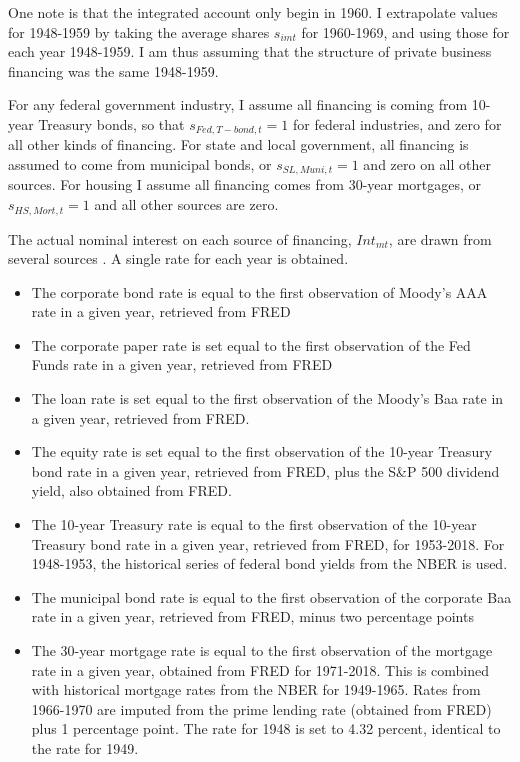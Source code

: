 \documentclass[11pt]{article}
\begin{document}
One note is that the integrated account only begin in 1960. I extrapolate values for 1948-1959 by taking the average shares $s_{imt}$ for 1960-1969, and using those for each year 1948-1959. I am thus assuming that the structure of private business financing was the same 1948-1959. 

For any federal government industry, I assume all financing is coming from 10-year Treasury bonds, so that $s_{Fed,T-bond,t} = 1$ for federal industries, and zero for all other kinds of financing. For state and local government, all financing is assumed to come from municipal bonds, or $s_{SL,Muni,t} = 1$ and zero on all other sources. For housing I assume all financing comes from 30-year mortgages, or $s_{HS,Mort,t}=1$ and all other sources are zero. 

The actual nominal interest on each source of financing, $Int_{mt}$, are drawn from several sources \citep{fedint,fredmort,moodys,nberhistory}. A single rate for each year is obtained.

\begin{itemize}
	\item The corporate bond rate is equal to the first observation of Moody's AAA rate in a given year, retrieved from FRED
	\item The corporate paper rate is set equal to the first observation of the Fed Funds rate in a given year, retrieved from FRED
	\item The loan rate is set equal to the first observation of the Moody's Baa rate in a given year, retrieved from FRED.
	\item The equity rate is set equal to the first observation of the 10-year Treasury bond rate in a given year, retrieved from FRED, plus the S\&P 500 dividend yield, also obtained from FRED.
	\item The 10-year Treasury rate is equal to the first observation of the 10-year Treasury bond rate in a given year, retrieved from FRED, for 1953-2018. For 1948-1953, the historical series of federal bond yields from the NBER is used. 
	\item The municipal bond rate is equal to the first observation of the corporate Baa rate in a given year, retrieved from FRED, minus two percentage points
	\item The 30-year mortgage rate is equal to the first observation of the mortgage rate in a given year, obtained from FRED for 1971-2018. This is combined with historical mortgage rates from the NBER for 1949-1965. Rates from 1966-1970 are imputed from the prime lending rate (obtained from FRED) plus 1 percentage point. The rate for 1948 is set to 4.32 percent, identical to the rate for 1949.
\end{itemize}
\end{document}
